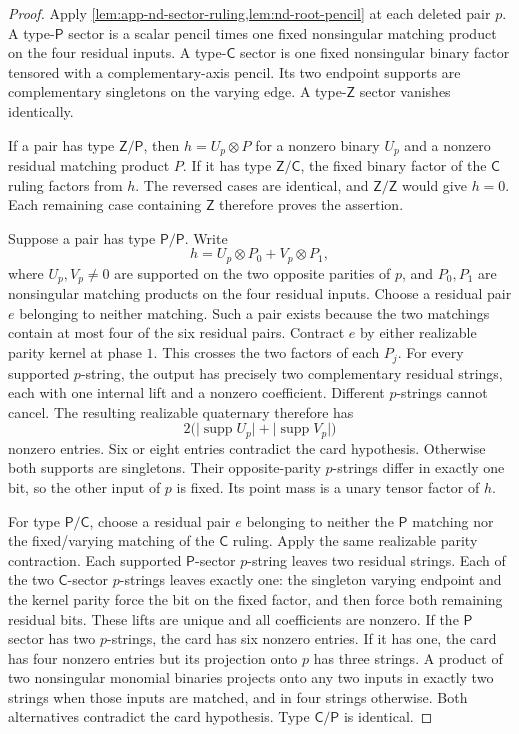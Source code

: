 \documentclass[11pt,letterpaper,onecolumn]{article}
\theoremstyle{plain}
\theoremstyle{definition}
\theoremstyle{remark}
\newcommand{\supp}{\operatorname{supp}}
\begin{document}
\begin{proof}
Apply \cref{lem:app-nd-sector-ruling,lem:nd-root-pencil} at each
deleted pair \(p\).  A type-\(\mathsf P\)
sector is a scalar pencil times one fixed nonsingular matching product
on the four residual inputs.  A type-\(\mathsf C\) sector is one fixed
nonsingular binary factor tensored with a complementary-axis pencil.
Its two endpoint supports are complementary singletons on the varying
edge.  A type-\(\mathsf Z\) sector vanishes identically.

If a pair has type \(\mathsf{Z}/\mathsf{P}\), then \(h=U_p\otimes P\) for a nonzero
binary \(U_p\) and a nonzero residual matching product \(P\).  If it
has type \(\mathsf{Z}/\mathsf{C}\), the fixed binary factor of the \(\mathsf C\) ruling factors
from \(h\).  The reversed cases are identical, and \(\mathsf{Z}/\mathsf{Z}\) would give
\(h=0\).  Each remaining case containing \(\mathsf Z\) therefore proves the
assertion.

Suppose a pair has type \(\mathsf{P}/\mathsf{P}\).  Write
\[
 h=U_p\otimes P_0+V_p\otimes P_1,
\]
where \(U_p,V_p\ne0\) are supported on the two opposite parities of
\(p\), and \(P_0,P_1\) are nonsingular matching products on the four
residual inputs.  Choose a residual pair \(e\) belonging to neither
matching.  Such a pair exists because the two matchings contain at most
four of the six residual pairs.  Contract \(e\) by either realizable
parity kernel at phase \(1\).  This crosses the two factors of each
\(P_j\).  For every supported \(p\)-string, the output has precisely
two complementary residual strings, each with one internal lift and a
nonzero coefficient.  Different \(p\)-strings cannot cancel.  The
resulting realizable quaternary therefore has
\[
 2\bigl(\lvert\supp U_p\rvert+\lvert\supp V_p\rvert\bigr)
\]
nonzero entries.  Six or eight entries contradict the card hypothesis.
Otherwise both supports are singletons.  Their opposite-parity
\(p\)-strings differ in exactly one bit, so the other input of
\(p\) is fixed.  Its point mass is a unary tensor factor of \(h\).

For type \(\mathsf{P}/\mathsf{C}\), choose a residual pair \(e\) belonging to neither
the \(\mathsf P\) matching nor the fixed/varying matching of the \(\mathsf C\)
ruling.  Apply the same realizable parity contraction.  Each supported
\(\mathsf P\)-sector \(p\)-string leaves two residual strings.  Each of the two
\(\mathsf C\)-sector \(p\)-strings leaves exactly one: the singleton varying
endpoint and the kernel parity force the bit on the fixed factor, and
then force both remaining residual bits.  These lifts are unique and
all coefficients are nonzero.  If the \(\mathsf P\) sector has two
\(p\)-strings, the card has six nonzero entries.  If it has one, the
card has four nonzero entries but its projection onto \(p\) has
three strings.  A product of two nonsingular monomial binaries projects
onto any two inputs in exactly two strings when those inputs are matched,
and in four strings otherwise.  Both alternatives contradict the card
hypothesis.  Type \(\mathsf{C}/\mathsf{P}\) is identical.


\end{proof}
\end{document}

